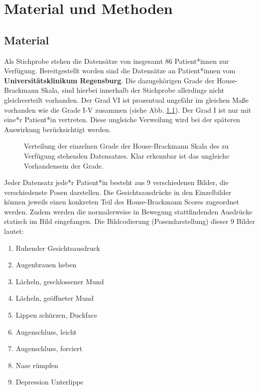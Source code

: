 \chapter{Material und Methoden}\label{mat_and_method}
\section{Material}\label{material}
Als Stichprobe stehen die Datensätze von insgesamt 86 Patient*innen zur Verfügung. Bereitgestellt worden sind die Datensätze an Patient*innen vom \textbf{Universitätsklinikum Regensburg}. Die dazugehörigen Grade der House-Brackmann Skala, sind hierbei innerhalb der Stichprobe allerdings nicht gleichverteilt vorhanden. Der Grad VI ist prozentual ungefähr im gleichen Maße vorhanden wie die Grade I-V zusammen (siehe Abb. \ref{cap:pie_grade}). Der Grad I ist nur mit eine*r Patient*in vertreten. Diese ungleiche Verweilung wird bei der späteren Auswirkung berücksichtigt werden.

\begin{figure}[!b]\centering
{}
\caption[Verteilung der einzelnen Grade der House-Brackmann Skala]{Verteilung der einzelnen Grade der House-Brackmann Skala des zu Verfügung stehenden Datensatzes. Klar erkennbar ist das ungleiche Vorhandensein der Grade.}\label{cap:pie_grade}
\end{figure}\label{fig:pie_grade}


 Jeder Datensatz jede*r Patient*in besteht aus 9 verschiedenen Bilder, die verschiedenste Posen darstellen. Die Gesichtsausdrücke in den Einzelbilder können jeweils einen konkreten Teil des House-Brackmann Scores zugeordnet werden. Zudem werden die normalerweise in Bewegung stattfindenden Ausdrücke statisch im Bild eingefangen. Die Bildcodierung (Posendarstellung) dieser 9 Bilder lautet:

\begin{enumerate}
  \setlength\itemsep{-0.6em}
\item Ruhender Gesichtsausdruck
\item Augenbrauen heben
\item Lächeln, geschlossener Mund
\item Lächeln, geöffneter Mund
\item Lippen schürzen, \glqq Duckface\grqq{}
\item Augenschluss, leicht
\item Augenschluss, forciert
\item Nase rümpfen
\item Depression Unterlippe
\end{enumerate}

